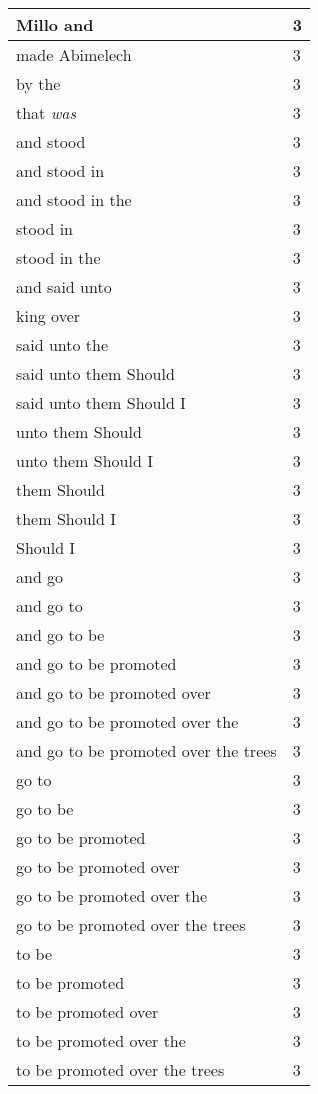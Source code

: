 \begin{center}
\begin{longtable}{|p{3.0in}|p{0.5in}|}
Millo and & 3\\ \hline 
made Abimelech & 3\\ \hline 
by the & 3\\ \hline 
that \emph{was} & 3\\ \hline 
and stood & 3\\ \hline 
and stood in & 3\\ \hline 
and stood in the & 3\\ \hline 
stood in & 3\\ \hline 
stood in the & 3\\ \hline 
and said unto & 3\\ \hline 
king over & 3\\ \hline 
said unto the & 3\\ \hline 
said unto them Should & 3\\ \hline 
said unto them Should I & 3\\ \hline 
unto them Should & 3\\ \hline 
unto them Should I & 3\\ \hline 
them Should & 3\\ \hline 
them Should I & 3\\ \hline 
Should I & 3\\ \hline 
and go & 3\\ \hline 
and go to & 3\\ \hline 
and go to be & 3\\ \hline 
and go to be promoted & 3\\ \hline 
and go to be promoted over & 3\\ \hline 
and go to be promoted over the & 3\\ \hline 
and go to be promoted over the trees & 3\\ \hline 
go to & 3\\ \hline 
go to be & 3\\ \hline 
go to be promoted & 3\\ \hline 
go to be promoted over & 3\\ \hline 
go to be promoted over the & 3\\ \hline 
go to be promoted over the trees & 3\\ \hline 
to be & 3\\ \hline 
to be promoted & 3\\ \hline 
to be promoted over & 3\\ \hline 
to be promoted over the & 3\\ \hline 
to be promoted over the trees & 3\\ \hline 

\end{longtable}
\end{center}
